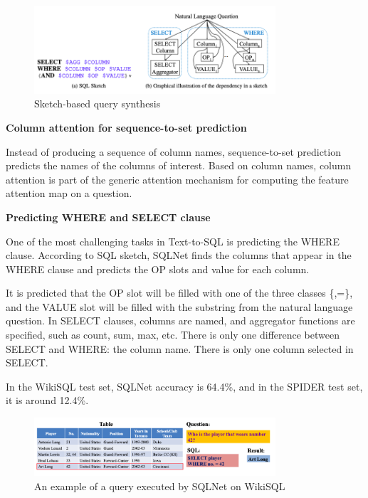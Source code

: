 \begin{figure}[htb]
    \centering
    \includegraphics[width=0.8\textwidth]{pics/sqlnet/sketch-based.png}
    \caption{Sketch-based query synthesis\cite{xu_sqlnet_2017}}
    \label{fig:sketch-based}
\end{figure}

\textbf{Column attention for sequence-to-set prediction}

Instead of producing a sequence of column names, sequence-to-set prediction predicts the names of the columns of interest.
Based on column names, column attention is part of the generic attention mechanism for computing the feature attention map on a question.

\textbf{Predicting WHERE and SELECT clause}

One of the most challenging tasks in Text-to-SQL is predicting the WHERE clause.
According to SQL sketch, SQLNet finds the columns that appear in the WHERE clause and predicts the OP slots and value for each column.

It is predicted that the OP slot will be filled with one of the three classes \{<,>,=\}, and the VALUE slot will be filled with the substring from the natural language question.
In SELECT clauses, columns are named, and aggregator functions are specified, such as count, sum, max, etc. There is only one difference between SELECT and WHERE: the column name. There is only one column selected in SELECT.

In the WikiSQL test set, SQLNet accuracy is 64.4\%, and in the SPIDER test set, it is around 12.4\%.

\begin{figure}[htb]
    \centering
    \includegraphics[width=0.8\textwidth]{pics/sqlnet/sqlnet-task.png}
    \caption{An example of a query executed by SQLNet on WikiSQL\cite{xu_sqlnet_2017}}
    \label{fig:sqlnet-task}
\end{figure}